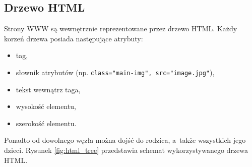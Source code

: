 \documentclass[a4paper,11pt]{article}
\begin{document}


\subsection{Drzewo HTML}

Strony WWW są wewnętrznie reprezentowane przez drzewo HTML. Każdy korzeń drzewa posiada następujące atrybuty:

\begin{itemize}
    \item tag,
    \item słownik atrybutów (np. \verb+class="main-img", src="image.jpg"+),
    \item tekst wewnątrz taga,
    \item wysokość elementu,
    \item szerokość elementu.
\end{itemize}

Ponadto od dowolnego węzła można dojść do rodzica, a~także wszystkich jego dzieci. Rysunek \ref{fig:html_tree} przedstawia schemat wykorzystywanego drzewa HTML.
\end{document}
